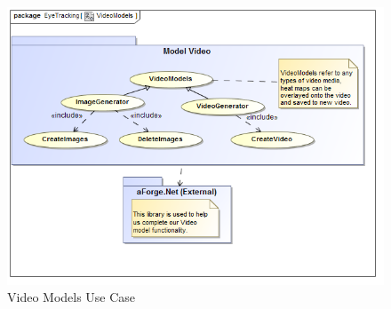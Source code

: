 	\begin{figure}[!ht]
		\centering
		\includegraphics[scale=0.5]{Diagrams/Use_Case_Diagram__VideoModels.png}
		\caption{Video Models Use Case}
	\end{figure}
	
